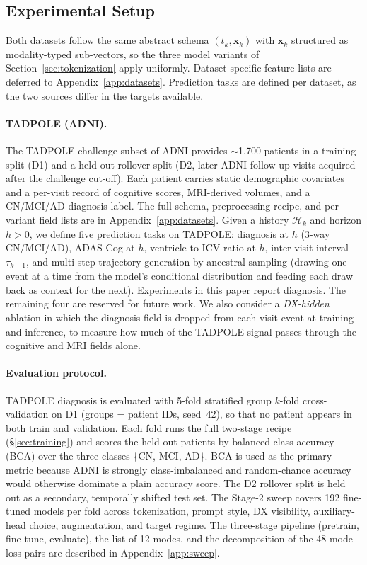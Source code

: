\documentclass{article}
\newcommand{\Hcal}{\mathcal{H}}
\begin{document}
\subsection{Experimental Setup}
\label{sec:setup}

Both datasets follow the same abstract schema $(t_k, \mathbf{x}_k)$ with $\mathbf{x}_k$ structured as modality-typed sub-vectors, so the three model variants of Section~\ref{sec:tokenization} apply uniformly. Dataset-specific feature lists are deferred to Appendix~\ref{app:datasets}.
Prediction tasks are defined per dataset, as the two sources differ in the targets available.

\paragraph{TADPOLE (ADNI).}
The TADPOLE challenge subset of ADNI \citep{adni,marinescu2019tadpole} provides $\sim$1{,}700 patients in a training split (D1) and a held-out rollover split (D2, later ADNI follow-up visits acquired after the challenge cut-off). Each patient carries static demographic covariates and a per-visit record of cognitive scores, MRI-derived volumes, and a CN/MCI/AD diagnosis label. The full schema, preprocessing recipe, and per-variant field lists are in Appendix~\ref{app:datasets}.
Given a history $\Hcal_k$ and horizon $h>0$, we define five prediction tasks on TADPOLE: diagnosis at $h$ (3-way CN/MCI/AD), ADAS-Cog at $h$, ventricle-to-ICV ratio at $h$, inter-visit interval $\tau_{k+1}$, and multi-step trajectory generation by ancestral sampling (drawing one event at a time from the model's conditional distribution and feeding each draw back as context for the next).
Experiments in this paper report diagnosis. The remaining four are reserved for future work.
We also consider a \emph{DX-hidden} ablation in which the diagnosis field is dropped from each visit event at training and inference, to measure how much of the TADPOLE signal passes through the cognitive and MRI fields alone.

\paragraph{Evaluation protocol.}
TADPOLE diagnosis is evaluated with 5-fold stratified group $k$-fold cross-validation on D1 (groups = patient IDs, seed~42), so that no patient appears in both train and validation.
Each fold runs the full two-stage recipe (§\ref{sec:training}) and scores the held-out patients by balanced class accuracy (BCA) over the three classes \{CN, MCI, AD\}. BCA is used as the primary metric because ADNI is strongly class-imbalanced and random-chance accuracy would otherwise dominate a plain accuracy score.
The D2 rollover split is held out as a secondary, temporally shifted test set.
The Stage-2 sweep covers 192 fine-tuned models per fold across tokenization, prompt style, DX visibility, auxiliary-head choice, augmentation, and target regime. The three-stage pipeline (pretrain, fine-tune, evaluate), the list of 12 modes, and the decomposition of the 48 mode-loss pairs are described in Appendix~\ref{app:sweep}.
\end{document}
